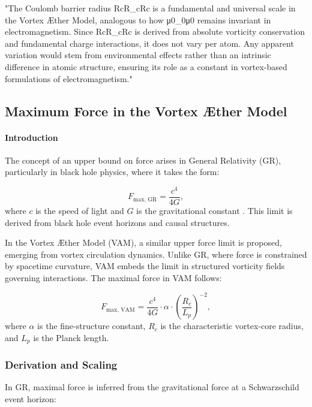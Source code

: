 \documentclass[aps,preprint,superscriptaddress]{revtex4-2}
\begin{document}
"The Coulomb barrier radius RcR_cRc​ is a fundamental and universal scale in the Vortex Æther Model, analogous to how μ0\mu_0μ0​ remains invariant in electromagnetism. Since RcR_cRc​ is derived from absolute vorticity conservation and fundamental charge interactions, it does not vary per atom. Any apparent variation would stem from environmental effects rather than an intrinsic difference in atomic structure, ensuring its role as a constant in vortex-based formulations of electromagnetism."




\subsection{Maximum Force in the Vortex \AE ther Model}


\paragraph*{Introduction}
The concept of an upper bound on force arises in General Relativity (GR), particularly in black hole physics, where it takes the form:


\begin{equation*}
F_{\text{max, GR}} = \frac{c^4}{4G},
\end{equation*}
where $c$ is the speed of light and $G$ is the gravitational constant \cite{Schiller2006}. This limit is derived from black hole event horizons and causal structures.


In the Vortex \AE ther Model (VAM), a similar upper force limit is proposed, emerging from vortex circulation dynamics. Unlike GR, where force is constrained by spacetime curvature, VAM embeds the limit in structured vorticity fields governing interactions. The maximal force in VAM follows:


\begin{equation*}
F_{\text{max, VAM}} = \frac{c^4}{4G} \cdot \alpha \cdot \left(\frac{R_c}{L_p}\right)^{-2},
\end{equation*}
where $\alpha$ is the fine-structure constant, $R_c$ is the characteristic vortex-core radius, and $L_p$ is the Planck length.


\subsubsection*{Derivation and Scaling}
In GR, maximal force is inferred from the gravitational force at a Schwarzschild event horizon:
\end{document}
